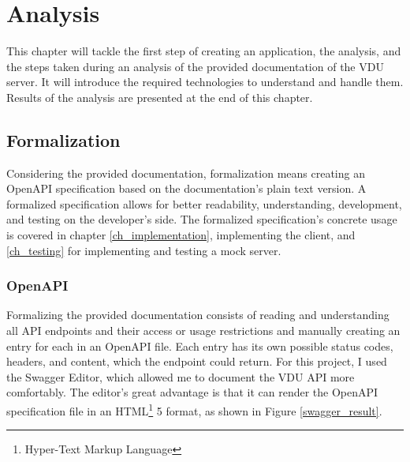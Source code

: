 \chapter{Analysis}
\label{ch_analysis}
This chapter will tackle the first step of creating an application, the analysis, and the steps taken during an analysis of the provided documentation of the VDU server. It will introduce the required technologies to understand and handle them. Results of the analysis are presented at the end of this chapter.


\section{Formalization}
Considering the provided documentation, formalization means creating an OpenAPI specification based on the documentation's plain text version. A formalized specification allows for better readability, understanding, development, and testing on the developer's side. The formalized specification's concrete usage is covered in chapter \ref{ch_implementation}, implementing the client, and \ref{ch_testing} for implementing and testing a mock server.

\subsection{OpenAPI}
Formalizing the provided documentation consists of reading and understanding all API endpoints and their access or usage restrictions and manually creating an entry for each in an OpenAPI file. Each entry has its own possible status codes, headers, and content, which the endpoint could return. For this project, I used the Swagger Editor, which allowed me to document the VDU API more comfortably. The editor's great advantage is that it can render the OpenAPI specification file in an HTML\footnote{Hyper-Text Markup Language} 5 format, as shown in Figure \ref{swagger_result}.

